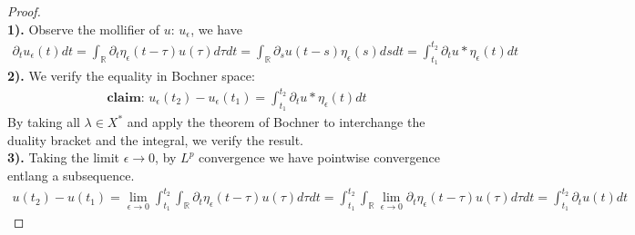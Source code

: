 \begin{proof}\quad\\
	\textbf{1). }Observe the mollifier of $u$: $u_\epsilon$, we have
	\begin{align*}
		\partial_tu_\epsilon(t) dt 
	=  \int_{\mathbb{R}} \partial_t \eta_\epsilon (t - \tau) u(\tau) d\tau dt 
	= \int_{\mathbb{R}} \partial_s u (t -s) \eta_\epsilon (s)ds dt  = \int_{t_1}^{t_2} \partial_t u * \eta_\epsilon (t) dt 
	\end{align*}
	\textbf{2).}
	We verify the equality in Bochner space:
	\begin{align*}
	\textbf{claim: }  u_\epsilon(t_2) - u_\epsilon(t_1) = \int_{t_1}^{t_2} \partial_t u * \eta_\epsilon (t) dt
	\end{align*}
	By taking all $\lambda \in X^*$ and apply the theorem of Bochner to interchange the duality bracket and the integral, we verify the result.\\
	\textbf{3). }Taking the limit $\epsilon \rightarrow 0$, by $L^p$ convergence we have pointwise convergence entlang a subsequence.
	\begin{align*}
		u(t_2) - u(t_1) = \lim_{\epsilon \rightarrow 0} \int_{t_1}^{t_2}\int_{\mathbb{R}} \partial_t \eta_\epsilon (t - \tau) u(\tau) d\tau dt = \int_{t_1}^{t_2}\int_{\mathbb{R}} \lim_{\epsilon \rightarrow 0} \partial_t \eta_\epsilon (t - \tau) u(\tau) d\tau dt = \int_{t_1}^{t_2} \partial_t u(t)dt
	\end{align*}
\end{proof}

